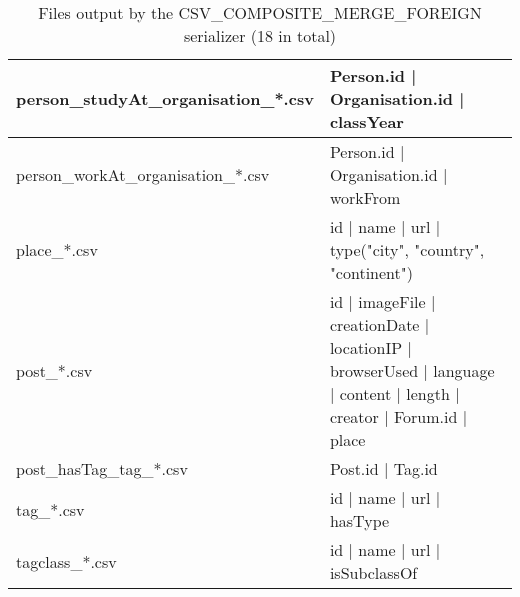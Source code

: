 \begin{table}[htb]
{\begin{tabular}{|p{4.3cm}|p{12.4cm}|}
    	person\_studyAt\_organisation\_*.csv & Person.id | Organisation.id | classYear                                                                             \\ \hline
    	person\_workAt\_organisation\_*.csv  & Person.id | Organisation.id | workFrom                                                                              \\ \hline
    	place\_*.csv                         & id | name | url | type({"city", "country", "continent"})                                                            \\ \hline
    	post\_*.csv                          & id | imageFile | creationDate | locationIP | browserUsed | language | content | length | creator | Forum.id | place \\ \hline
    	post\_hasTag\_tag\_*.csv             & Post.id | Tag.id                                                                                                    \\ \hline
    	tag\_*.csv                           & id | name | url | hasType                                                                                           \\ \hline
    	tagclass\_*.csv                      & id | name | url | isSubclassOf                                                                                      \\ \hline
    \end{tabular}}
    \caption{Files output by the CSV\_COMPOSITE\_MERGE\_FOREIGN serializer (18 in total)}
    \label{table:csv_merge_foreign}
\end{table}
